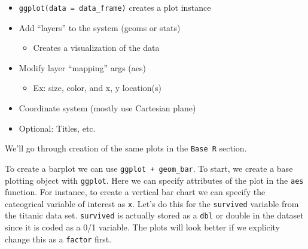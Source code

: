 \documentclass[
]{book}
\newenvironment{Shaded}{\begin{snugshade}}{\end{snugshade}}
\newcommand{\DataTypeTok}[1]{\textcolor[rgb]{0.13,0.29,0.53}{#1}}
\newcommand{\KeywordTok}[1]{\textcolor[rgb]{0.13,0.29,0.53}{\textbf{#1}}}
\newcommand{\NormalTok}[1]{#1}
\newcommand{\OperatorTok}[1]{\textcolor[rgb]{0.81,0.36,0.00}{\textbf{#1}}}
\newcommand{\StringTok}[1]{\textcolor[rgb]{0.31,0.60,0.02}{#1}}
\providecommand{\tightlist}{%
  \setlength{\itemsep}{0pt}\setlength{\parskip}{0pt}}
\theoremstyle{definition}
\theoremstyle{definition}
\theoremstyle{definition}
\theoremstyle{remark}
\begin{document}
\begin{itemize}
\tightlist
\item
  \texttt{ggplot(data\ =\ data\_frame)} creates a plot instance\\
\item
  Add ``layers'' to the system (geoms or stats)

  \begin{itemize}
  \tightlist
  \item
    Creates a visualization of the data\\
  \end{itemize}
\item
  Modify layer ``mapping'' args (aes)

  \begin{itemize}
  \tightlist
  \item
    Ex: size, color, and x, y location(s)\\
  \end{itemize}
\item
  Coordinate system (mostly use Cartesian plane)\\
\item
  Optional: Titles, etc.
\end{itemize}

We'll go through creation of the same plots in the \texttt{Base\ R} section.

To create a barplot we can use \texttt{ggplot\ +\ geom\_bar}. To start, we create a base plotting object with \texttt{ggplot}. Here we can specify attributes of the plot in the \texttt{aes} function. For instance, to create a vertical bar chart we can specify the cateogrical variable of interest as \texttt{x}. Let's do this for the \texttt{survived} variable from the titanic data set. \texttt{survived} is actually stored as a \texttt{dbl} or double in the dataset since it is coded as a 0/1 variable. The plots will look better if we explicity change this as a \texttt{factor} first.

\begin{Shaded}
\end{Shaded}
\end{document}

